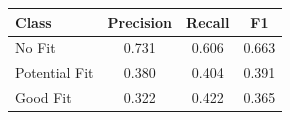 \begin{tabular}{lccc}
\toprule
Class & Precision & Recall & F1 \\
\midrule
No Fit & 0.731 & 0.606 & 0.663 \\
Potential Fit & 0.380 & 0.404 & 0.391 \\
Good Fit & 0.322 & 0.422 & 0.365 \\
\bottomrule
\end{tabular}